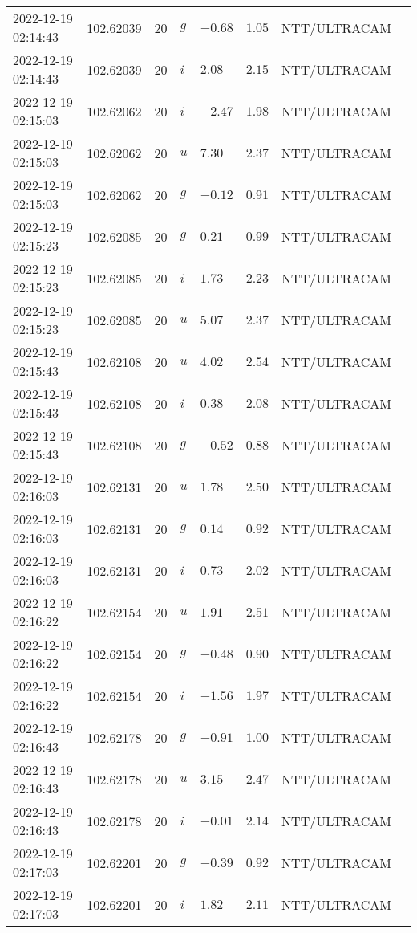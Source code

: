 \documentclass{nature_plusfigure}
\begin{document}
\begin{supplement}
\begin{center}
\begin{longtable}{llllllll}
2022-12-19 02:14:43 & 102.62039 & 20 & $g$ & $-0.68$ & $1.05$ & NTT/ULTRACAM &  \\ 
2022-12-19 02:14:43 & 102.62039 & 20 & $i$ & $2.08$ & $2.15$ & NTT/ULTRACAM &  \\ 
2022-12-19 02:15:03 & 102.62062 & 20 & $i$ & $-2.47$ & $1.98$ & NTT/ULTRACAM &  \\ 
2022-12-19 02:15:03 & 102.62062 & 20 & $u$ & $7.30$ & $2.37$ & NTT/ULTRACAM &  \\ 
2022-12-19 02:15:03 & 102.62062 & 20 & $g$ & $-0.12$ & $0.91$ & NTT/ULTRACAM &  \\ 
2022-12-19 02:15:23 & 102.62085 & 20 & $g$ & $0.21$ & $0.99$ & NTT/ULTRACAM &  \\ 
2022-12-19 02:15:23 & 102.62085 & 20 & $i$ & $1.73$ & $2.23$ & NTT/ULTRACAM &  \\ 
2022-12-19 02:15:23 & 102.62085 & 20 & $u$ & $5.07$ & $2.37$ & NTT/ULTRACAM &  \\ 
2022-12-19 02:15:43 & 102.62108 & 20 & $u$ & $4.02$ & $2.54$ & NTT/ULTRACAM &  \\ 
2022-12-19 02:15:43 & 102.62108 & 20 & $i$ & $0.38$ & $2.08$ & NTT/ULTRACAM &  \\ 
2022-12-19 02:15:43 & 102.62108 & 20 & $g$ & $-0.52$ & $0.88$ & NTT/ULTRACAM &  \\ 
2022-12-19 02:16:03 & 102.62131 & 20 & $u$ & $1.78$ & $2.50$ & NTT/ULTRACAM &  \\ 
2022-12-19 02:16:03 & 102.62131 & 20 & $g$ & $0.14$ & $0.92$ & NTT/ULTRACAM &  \\ 
2022-12-19 02:16:03 & 102.62131 & 20 & $i$ & $0.73$ & $2.02$ & NTT/ULTRACAM &  \\ 
2022-12-19 02:16:22 & 102.62154 & 20 & $u$ & $1.91$ & $2.51$ & NTT/ULTRACAM &  \\ 
2022-12-19 02:16:22 & 102.62154 & 20 & $g$ & $-0.48$ & $0.90$ & NTT/ULTRACAM &  \\ 
2022-12-19 02:16:22 & 102.62154 & 20 & $i$ & $-1.56$ & $1.97$ & NTT/ULTRACAM &  \\ 
2022-12-19 02:16:43 & 102.62178 & 20 & $g$ & $-0.91$ & $1.00$ & NTT/ULTRACAM &  \\ 
2022-12-19 02:16:43 & 102.62178 & 20 & $u$ & $3.15$ & $2.47$ & NTT/ULTRACAM &  \\ 
2022-12-19 02:16:43 & 102.62178 & 20 & $i$ & $-0.01$ & $2.14$ & NTT/ULTRACAM &  \\ 
2022-12-19 02:17:03 & 102.62201 & 20 & $g$ & $-0.39$ & $0.92$ & NTT/ULTRACAM &  \\ 
2022-12-19 02:17:03 & 102.62201 & 20 & $i$ & $1.82$ & $2.11$ & NTT/ULTRACAM &  \\ 

\end{longtable}
\end{center}
\end{supplement}
\end{document}
